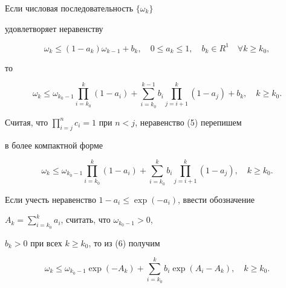 \begin{lem}


Если числовая последовательность $\{\omega_k\}$


удовлетворяет неравенству


\begin{equation}\label {4}


\omega_k \leq (1-a_k)\omega_{k-1}+b_k,\quad 0\leq a_k\leq 1,\quad b_k\in


R^1\quad \forall k\geq k_0,


\end{equation}


то


\begin{equation}\label {5}


\omega_k \leq \omega_{k_0-1}\prod


_{i=k_0}^k(1-a_i)+\sum_{i=k_0}^{k-1}b_i


\prod_{j=i+1}^k(1-a_j)+b_k,\quad k\geq k_0.


\end{equation}


\end{lem}





Считая, что $\prod\limits_{i=j}^nc_i =1$ при $n<j$, неравенство (5) перепишем


в более компактной форме


\begin{equation}\label {6}


\omega_k \leq \omega_{k_0-1}\prod_{i=k_0}^k(1-a_i)+\sum_{i=k_0}^kb_i


\prod_{j=i+1}^k(1-a_j),\quad k\geq k_0.


\end{equation}


Если учесть неравенство $1-a_i \leq \exp(-a_i)$, ввести обозначение


$A_k=\sum\limits_{i=k_0}^ka_i$, считать, что $\omega_{k_0-1} >0$,


$b_k >0$ при всех $k\geq k_0$, то из (6) получим


\begin{equation}\label {7}


\omega_k \leq \omega_{k_0-1}\exp(-A_k)+\sum_{i=k_0}^kb_i


\exp(A_i-A_k),\quad


k\geq k_0.


\end{equation}





